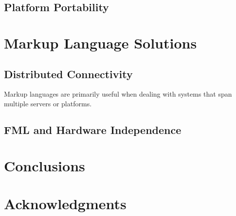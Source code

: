 \documentclass{sig-alternate}
\begin{document}
\subsection*{Platform Portability}


\section{Markup Language Solutions}\label{ML}



\subsection*{Distributed Connectivity}
Markup languages are primarily useful when dealing with systems that span multiple servers or platforms. 


\subsection*{FML and Hardware Independence}


\section{Conclusions}


\section{Acknowledgments}




\end{document}
